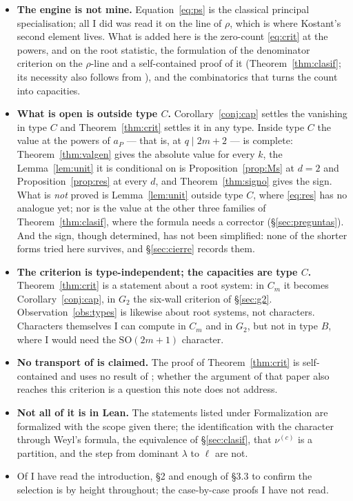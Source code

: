 \documentclass[11pt,a4paper]{article}
\theoremstyle{definition}
\newcommand{\SO}{\mathrm{SO}}
\begin{document}
\begin{itemize}\itemsep2pt
\item \textbf{The engine is not mine.} Equation~\eqref{eq:ps} is the classical principal
specialisation; all I did was read it on the line of $\rho$, which is where Kostant's second element
lives. What is added here is the zero-count \eqref{eq:crit} at the powers, and on the root statistic, the formulation of the denominator criterion on the $\rho$-line and a self-contained proof of it
(Theorem~\ref{thm:clasif}; its necessity also follows from \cite{GS19}), and the combinatorics that turns the
count into capacities.
\item \textbf{What is open is outside type $C$.} Corollary~\ref{conj:cap} settles the vanishing in
type $C$ and Theorem~\ref{thm:crit} settles it in any type. Inside type $C$ the value at the
powers of $a_P$ --- that is, at $q\mid 2m+2$ --- is complete:
Theorem~\ref{thm:valgen} gives the absolute value for every $k$, the Lemma~\ref{lem:unit} it is
conditional on is Proposition~\ref{prop:Ms} at $d=2$ and Proposition~\ref{prop:res} at every $d$,
and Theorem~\ref{thm:signo} gives the sign. What is \emph{not} proved is Lemma~\ref{lem:unit}
outside type $C$, where \eqref{eq:res} has no analogue yet; nor is the value at the other three
families of Theorem~\ref{thm:clasif}, where the formula needs a corrector (\S\ref{sec:preguntas}).
And the sign, though determined, has not been simplified: none of the shorter forms tried here
survives, and \S\ref{sec:cierre} records them.
\item \textbf{The criterion is type-independent; the capacities are type $C$.}
Theorem~\ref{thm:crit} is a statement about a root system: in $C_m$ it becomes
Corollary~\ref{conj:cap}, in $G_2$ the six-wall criterion of \S\ref{sec:g2}. Observation~\ref{obs:types}
is likewise about root systems, not characters. Characters themselves I can compute in $C_m$ and in
$G_2$, but not in type $B$, where I would need the $\SO(2m+1)$ character.
\item \textbf{No transport of \cite{Prasad16} is claimed.} The proof of Theorem~\ref{thm:crit} is
self-contained and uses no result of \cite{Prasad16}; whether the argument of that paper also reaches
this criterion is a question this note does not address.
\item \textbf{Not all of it is in Lean.} The statements listed under Formalization are formalized
with the scope given there; the identification with the character through Weyl's formula, the
equivalence of \S\ref{sec:clasif}, that $\nu^{(c)}$ is a partition, and the step from dominant
$\lambda$ to $\ell$ are not.
\item Of \cite{Polo25} I have read the introduction, \S2 and enough of \S3.3 to confirm the selection
is by height throughout; the case-by-case proofs I have not read.
\end{itemize}
\end{document}
